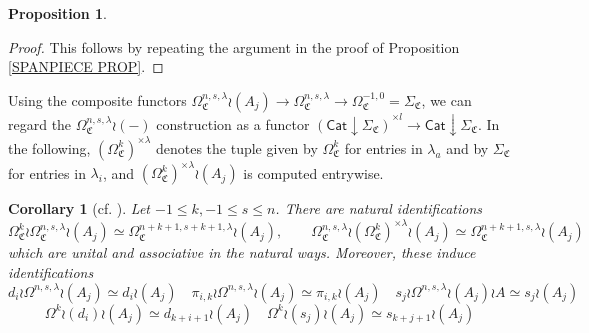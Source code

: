 \documentclass[a4paper,10pt
,draft
]{article}%
\numberwithin{equation}{section}
\numberwithin{figure}{section}
\newtheorem{proposition}[equation]{Proposition}%
\newtheorem{corollary}[equation]{Corollary}%
\theoremstyle{definition} %
\newcommand{\1}{\ensuremath{\mathbbm 1}}%
\newcommand{\OC}{\Omega_{\mathfrak C}}
\begin{document}
\begin{proposition}
\end{proposition}



\begin{proof}
	This follows by repeating the argument in the proof of Proposition \ref{SPANPIECE PROP}.
\end{proof}



Using the composite functors
$\Omega_{\mathfrak{C}}^{n,s,\lambda} \wr (A_j)
\to \Omega_{\mathfrak{C}}^{n,s,\lambda} 
\to \Omega^{-1,0}_{\mathfrak{C}} = \Sigma_{\mathfrak{C}}$,
we can regard the 
$\Omega_{\mathfrak{C}}^{n,s,\lambda} \wr (-)$
construction as a functor
$\left(\mathsf{Cat}\downarrow \Sigma_{\mathfrak{C}}\right)^{\times l}
\to \mathsf{Cat}\downarrow \Sigma_{\mathfrak{C}}$.
%
In the following, 
$(\OC^k)^{\times \lambda}$
denotes the tuple given by 
$\OC^k$ for entries in $\lambda_a$ and by
$\Sigma_{\mathfrak{C}}$ for entries in $\lambda_i$,
and $(\OC^k)^{\times \lambda} \wr (A_j)$ is computed entrywise.

\begin{corollary}[{cf. \cite[Cor. 5.35]{BP_geo}}]
	\label{LABIDEN_COR}
	Let $-1 \leq k, -1 \leq s \leq n$.
	There are natural identifications
	\[
	\OC^k \wr \OC^{n,s,\lambda} \wr (A_j) \simeq
	\OC^{n+k+1,s+k+1,\lambda} \wr (A_j),
	\qquad
	\OC^{n,s,\lambda} \wr (\OC^k)^{\times \lambda} \wr (A_j) \simeq
	\OC^{n+k+1,s,\lambda} \wr (A_j)	
	\]
	which are unital and associative in the natural ways.
	Moreover, these induce identifications
	\[
	d_i \wr \Omega^{n,s,\lambda} \wr (A_j) \simeq d_i \wr (A_j)
	\quad
	\pi_{i,k} \wr \Omega^{n,s,\lambda} \wr (A_j) \simeq \pi_{i,k} \wr (A_j)
	\quad
	s_j \wr \Omega^{n,s,\lambda} \wr (A_j) \wr A \simeq s_j \wr  (A_j)
	\]
	\[
	\Omega^k \wr (d_i) \wr (A_j) \simeq d_{k+i+1} \wr (A_j)
	\quad
	\Omega^k \wr (s_j) \wr (A_j) \simeq s_{k+j+1} \wr (A_j)
	\]
\end{corollary}
\end{document}
